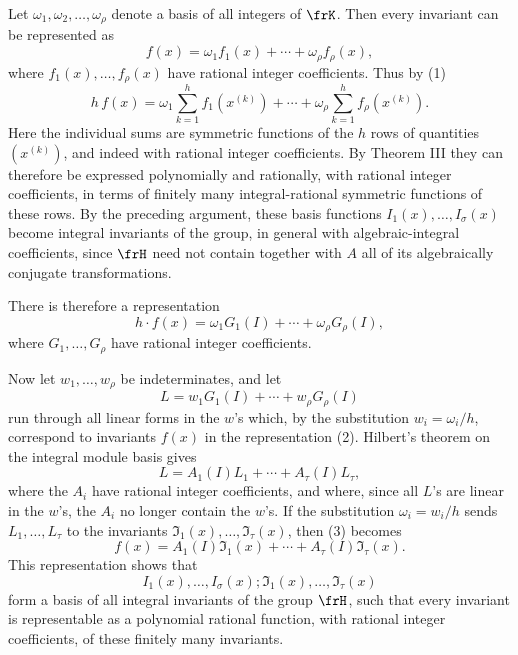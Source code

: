 \documentclass[11pt]{article}
\begin{document}
Let \(\omega_1,\omega_2,\ldots,\omega_\rho\) denote a basis of all integers of \(\frK\). Then every invariant can be represented as
\[
        f(x)=\omega_1 f_1(x)+\cdots+\omega_\rho f_\rho(x),
\]
where \(f_1(x),\ldots,f_\rho(x)\) have rational integer coefficients. Thus by (1)
\[
        h\,f(x)
        =
        \omega_1\sum_{k=1}^{h}f_1(x^{(k)})
        +\cdots+
        \omega_\rho\sum_{k=1}^{h}f_\rho(x^{(k)}).
\]
Here the individual sums are symmetric functions of the \(h\) rows of quantities \((x^{(k)})\), and indeed with rational integer coefficients. By Theorem III they can therefore be expressed polynomially and rationally, with rational integer coefficients, in terms of finitely many integral-rational symmetric functions of these rows. By the preceding argument, these basis functions \(I_1(x),\ldots,I_\sigma(x)\) become integral invariants of the group, in general with algebraic-integral coefficients, since \(\frH\) need not contain together with \(A\) all of its algebraically conjugate transformations.

There is therefore a representation
\begin{equation}
        h\cdot f(x)=\omega_1G_1(I)+\cdots+\omega_\rho G_\rho(I),
\end{equation}
where \(G_1,\ldots,G_\rho\) have rational integer coefficients.

Now let \(w_1,\ldots,w_\rho\) be indeterminates, and let
\[
        L=w_1G_1(I)+\cdots+w_\rho G_\rho(I)
\]
run through all linear forms in the \(w\)'s which, by the substitution \(w_i=\omega_i/h\), correspond to invariants \(f(x)\) in the representation (2). Hilbert's theorem on the integral module basis gives
\begin{equation}
        L=A_1(I)L_1+\cdots+A_\tau(I)L_\tau,
\end{equation}
where the \(A_i\) have rational integer coefficients, and where, since all \(L\)'s are linear in the \(w\)'s, the \(A_i\) no longer contain the \(w\)'s. If the substitution \(\omega_i=w_i/h\) sends \(L_1,\ldots,L_\tau\) to the invariants \(\mathfrak I_1(x),\ldots,\mathfrak I_\tau(x)\), then (3) becomes
\begin{equation}
        f(x)=A_1(I)\mathfrak I_1(x)+\cdots+A_\tau(I)\mathfrak I_\tau(x).
\end{equation}
This representation shows that
\[
        I_1(x),\ldots,I_\sigma(x);\mathfrak I_1(x),\ldots,\mathfrak I_\tau(x)
\]
form a basis of all integral invariants of the group \(\frH\), such that every invariant is representable as a polynomial rational function, with rational integer coefficients, of these finitely many invariants.
\end{document}
